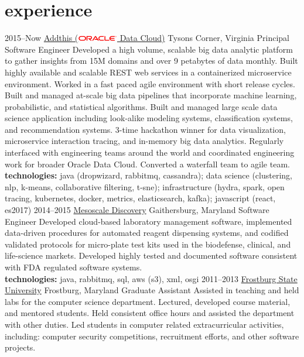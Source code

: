 \documentclass[]{friggeri-cv} %
\begin{document}
\section{experience}
\begin{entrylist}
\entry
{2015--Now}
{\href{https://www.addthis.com/}{Addthis (\includegraphics[width=50pt]{500px-Oracle_logo.svg.png}  Data Cloud)}}
{Tysons Corner, Virginia}
{Principal Software Engineer}
{
	Developed a high volume, scalable big data analytic platform to gather insights from 15M domains and over 9 petabytes of data monthly. Built highly available and scalable REST web services in a containerized microservice environment. Worked in a fast paced agile environment with short release cycles. Built and managed at-scale big data pipelines that incorporate machine learning, probabilistic, and statistical algorithms. Built and managed large scale data science application including look-alike modeling systems, classification systems, and recommendation systems. 3-time hackathon winner for data visualization, microservice interaction tracing, and in-memory big data analytics. Regularly interfaced with engineering teams around the world and coordinated engineering work for broader Oracle Data Cloud. Converted a waterfall team to agile team.\\
	\textbf{technologies:} java (dropwizard, rabbitmq, cassandra); data science (clustering, nlp, k-means, collaborative filtering, t-sne); infrastructure (hydra, spark, open tracing, kubernetes, docker, metrics, elasticsearch, kafka); javascript (react, es2017)
}
\entry
{2014--2015}
{\href{https://www.mesoscale.com/}{Mesoscale Discovery}}
{Gaithersburg, Maryland}
{Software Engineer}
{
	Developed cloud-based laboratory management software, implemented data-driven procedures for automated reagent dispensing systems, and codified validated protocols for micro-plate test kits used in the biodefense, clinical, and life-science markets. Developed highly tested and documented software consistent with FDA regulated software systems.\\
	\textbf{technologies:} java, rabbitmq, sql, aws (s3), xml, osgi
}
\entry
{2011--2013}
{\href{http://www.frostburg.edu/}{Frostburg State University}}
{Frostburg, Maryland}
{Graduate Assistant}
{
	Assisted in teaching and held labs for the computer science department. Lectured, developed course material, and mentored students. Held consistent office hours and assisted the department with other duties. Led students in computer related extracurricular activities, including: computer security competitions, recruitment efforts, and other software projects.
}
\end{entrylist}
\end{document}
